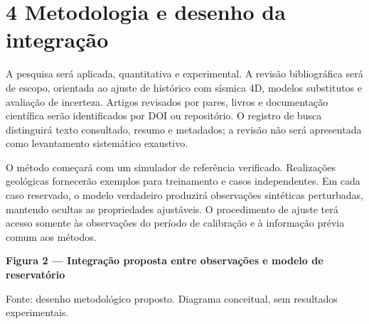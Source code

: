 \documentclass[12pt,a4paper]{article}
\begin{document}
\section*{4 Metodologia e desenho da integração}
A pesquisa será aplicada, quantitativa e experimental. A revisão bibliográfica será de escopo, orientada ao ajuste de histórico com sísmica 4D, modelos substitutos e avaliação de incerteza. Artigos revisados por pares, livros e documentação científica serão identificados por DOI ou repositório. O registro de busca distinguirá texto consultado, resumo e metadados; a revisão não será apresentada como levantamento sistemático exaustivo.\par
O método começará com um simulador de referência verificado. Realizações geológicas fornecerão exemplos para treinamento e casos independentes. Em cada caso reservado, o modelo verdadeiro produzirá observações sintéticas perturbadas, mantendo ocultas as propriedades ajustáveis. O procedimento de ajuste terá acesso somente às observações do período de calibração e à informação prévia comum aos métodos.\par
\noindent\textbf{\small Figura 2 --- Integração proposta entre observações e modelo de reservatório}\par
\begin{center}\end{center}{\noindent\small Fonte: desenho metodológico proposto. Diagrama conceitual, sem resultados experimentais.\par}
\end{document}
